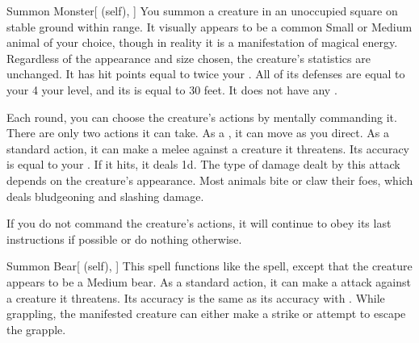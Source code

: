 \lowercase{\hypertarget{spell:Summon Monster}{}}\label{spell:Summon Monster}
\begin{attuneability}[\nth{1}]{\hypertarget{spell:Summon Monster}{Summon Monster}}[ (self), ]
You summon a creature in an unoccupied square on stable ground within \rngmed range.
It visually appears to be a common Small or Medium animal of your choice, though in reality it is a manifestation of magical energy.
Regardless of the appearance and size chosen, the creature's statistics are unchanged.
It has hit points equal to twice your .
All of its defenses are equal to your 4 \add your level, and its  is equal to 30 feet.
It does not have any .

Each round, you can choose the creature's actions by mentally commanding it.
There are only two actions it can take.
As a , it can move as you direct.
As a standard action, it can make a melee  against a creature it threatens.
Its accuracy is equal to your .
If it hits, it deals  \minus1d.
The type of damage dealt by this attack depends on the creature's appearance.
Most animals bite or claw their foes, which deals bludgeoning and slashing damage.

If you do not command the creature's actions, it will continue to obey its last instructions if possible or do nothing otherwise.
\end{attuneability}
\vspace{0.25em}



\lowercase{\hypertarget{spell:Summon Bear}{}}\label{spell:Summon Bear}
\begin{attuneability}[\nth{2}]{\hypertarget{spell:Summon Bear}{Summon Bear}}[ (self), ]
This spell functions like the  spell, except that the creature appears to be a Medium bear.
As a standard action, it can make a  attack against a creature it threatens.
Its accuracy is the same as its accuracy with .
While grappling, the manifested creature can either make a strike or attempt to escape the grapple.
\end{attuneability}
\vspace{0.25em}



